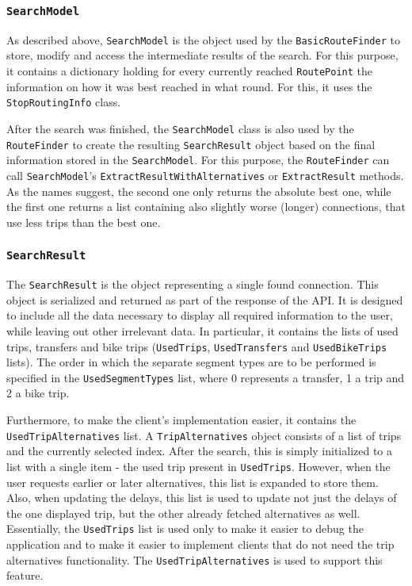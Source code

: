 \subsubsection{\texttt{SearchModel}}

As described above, \texttt{SearchModel} is the object used by the \texttt{BasicRouteFinder} to store, modify and access the intermediate results of the search. For this purpose, it contains a dictionary holding for every currently reached \texttt{RoutePoint} the information on how it was best reached in what round. For this, it uses the \texttt{StopRoutingInfo} class.

After the search was finished, the \texttt{SearchModel} class is also used by the \texttt{RouteFinder} to create the resulting \texttt{SearchResult} object based on the final information stored in the \texttt{SearchModel}. For this purpose, the \texttt{RouteFinder} can call \texttt{SearchModel}'s \texttt{ExtractResultWithAlternatives} or \texttt{ExtractResult} methods. As the names suggest, the second one only returns the absolute best one, while the first one returns a list containing also slightly worse (longer) connections, that use less trips than the best one.

\subsubsection{\texttt{SearchResult}}

The \texttt{SearchResult} is the object representing a single found connection. This object is serialized and returned as part of the response of the API. It is designed to include all the data necessary to display all required information to the user, while leaving out other irrelevant data. In particular, it contains the lists of used trips, transfers and bike trips (\texttt{UsedTrips}, \texttt{UsedTransfers} and \texttt{UsedBikeTrips} lists). The order in which the separate segment types are to be performed is specified in the \texttt{UsedSegmentTypes} list, where 0 represents a transfer, 1 a trip and 2 a bike trip. 

Furthermore, to make the client's implementation easier, it contains the \texttt{UsedTripAlternatives} list. A \texttt{TripAlternatives} object consists of a list of trips and the currently selected index. After the search, this is simply initialized to a list with a single item - the used trip present in \texttt{UsedTrips}. However, when the user requests earlier or later alternatives, this list is expanded to store them. Also, when updating the delays, this list is used to update not just the delays of the one displayed trip, but the other already fetched alternatives as well. Essentially, the \texttt{UsedTrips} list is used only to make it easier to debug the application and to make it easier to implement clients that do not need the trip alternatives functionality. The \texttt{UsedTripAlternatives} is used to support this feature.


